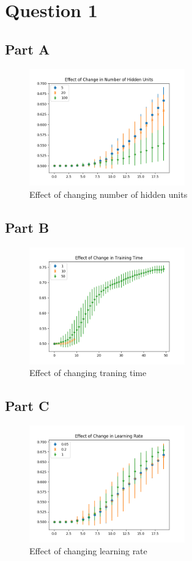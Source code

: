 \section{Question 1}
\subsection{Part A}
\begin{figure}[h]
	\centering
	\includegraphics[width=0.6\textwidth]{../train1/hidden_units.png}
	\caption{Effect of changing number of hidden units}
\end{figure}

\subsection{Part B}
\begin{figure}[h]
	\centering
	\includegraphics[width=0.6\textwidth]{../train1/epochs.png}
	\caption{Effect of changing traning time}
\end{figure}

\subsection{Part C}
\begin{figure}[h]
	\centering
	\includegraphics[width=0.6\textwidth]{../train1/learning_rate.png}
	\caption{Effect of changing learning rate}
\end{figure}

